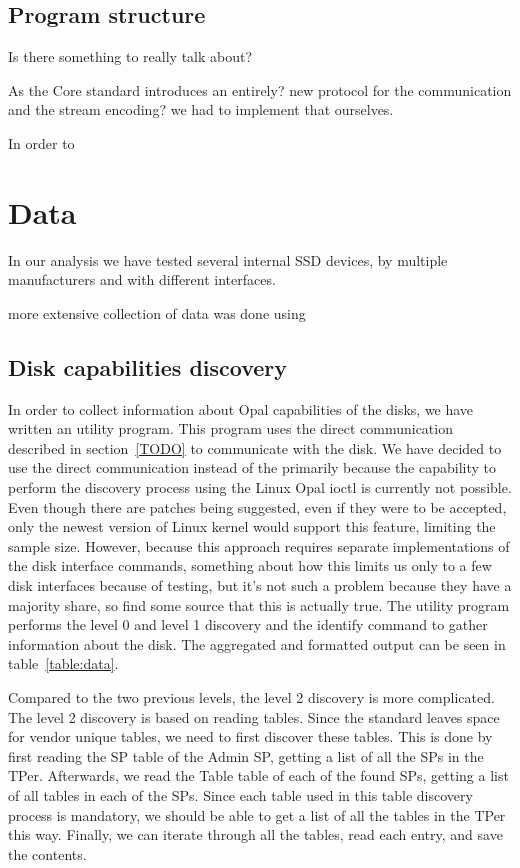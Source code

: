 \subsection{Program structure}






Is there something to really talk about? 

As the Core standard introduces an entirely? new protocol for the communication and the stream encoding? we had to implement that ourselves.

In order to 

\section{Data}

In our analysis we have tested several internal SSD devices, by multiple manufacturers and with different interfaces.

more extensive collection of data was done using 


\subsection{Disk capabilities discovery}


In order to collect information about Opal capabilities of the disks, we have written an utility program. This program uses the direct communication described in section~\ref{TODO} to communicate with the disk. We have decided to use the direct communication instead of the primarily because the capability to perform the discovery process using the Linux Opal ioctl is currently not possible. Even though there are patches being suggested, even if they were to be accepted, only the newest version of Linux kernel would support this feature, limiting the sample size.
However, because this approach requires separate implementations of the disk interface commands, something about how this limits us only to a few disk interfaces because of testing, but it's not such a problem because they have a majority share, so find some source that this is actually true.
The utility program performs the level 0 and level 1 discovery and the identify command to gather information about the disk.
The aggregated and formatted output can be seen in table~\ref{table:data}.

Compared to the two previous levels, the level 2 discovery is more complicated. The level 2 discovery is based on reading tables. Since the standard leaves space for vendor unique tables, we need to first discover these tables. This is done by first reading the SP table of the Admin SP, getting a list of all the SPs in the TPer. Afterwards, we read the Table table of each of the found SPs, getting a list of all tables in each of the SPs. Since each table used in this table discovery process is mandatory, we should be able to get a list of all the tables in the TPer this way. Finally, we can iterate through all the tables, read each entry, and save the contents.

